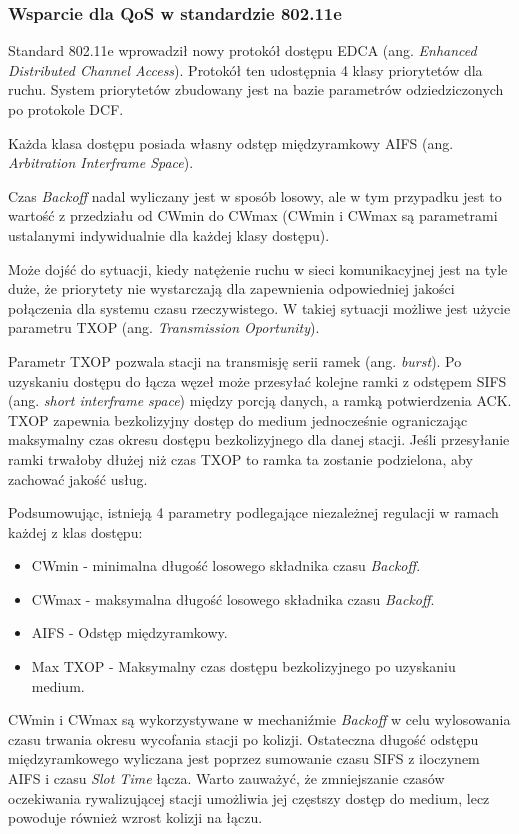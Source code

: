 \subsubsection{Wsparcie dla QoS w standardzie 802.11e}

Standard 802.11e wprowadził nowy protokół dostępu EDCA (ang. \emph{Enhanced Distributed Channel Access}). Protokół ten udostępnia 4 klasy priorytetów dla ruchu. System priorytetów zbudowany jest na bazie parametrów odziedziczonych po protokole DCF. 

Każda klasa dostępu posiada własny odstęp międzyramkowy AIFS (ang. \emph{Arbitration Interframe Space}).

Czas \emph{Backoff} nadal wyliczany jest w sposób losowy, ale w tym przypadku jest to wartość z przedziału od CWmin do CWmax (CWmin i CWmax są parametrami ustalanymi indywidualnie dla każdej klasy dostępu).

Może dojść do sytuacji, kiedy natężenie ruchu w sieci komunikacyjnej jest na tyle duże, że priorytety nie wystarczają dla zapewnienia odpowiedniej jakości połączenia dla systemu czasu rzeczywistego. W takiej sytuacji możliwe jest użycie parametru TXOP (ang. \emph{Transmission Oportunity}). 

Parametr TXOP pozwala stacji na transmisję serii ramek (ang. \emph{burst}). Po uzyskaniu dostępu do łącza
węzeł może przesyłać kolejne ramki z odstępem SIFS (ang. \emph{short interframe space}) między porcją danych, a
ramką potwierdzenia ACK. TXOP zapewnia bezkolizyjny dostęp do medium jednocześnie ograniczając maksymalny czas 
okresu dostępu bezkolizyjnego dla danej stacji. Jeśli przesyłanie ramki trwałoby dłużej niż czas TXOP to ramka
ta zostanie podzielona, aby zachować jakość usług.

Podsumowując, istnieją 4 parametry podlegające niezależnej regulacji w ramach każdej z klas dostępu:

\begin{itemize}
\item CWmin - minimalna długość losowego składnika czasu \emph{Backoff}.
\item CWmax - maksymalna długość losowego składnika czasu \emph{Backoff}.
\item AIFS - Odstęp międzyramkowy.
\item Max TXOP - Maksymalny czas dostępu bezkolizyjnego po uzyskaniu medium.
\end{itemize}

CWmin i CWmax są wykorzystywane w mechaniźmie \emph{Backoff} w celu wylosowania czasu trwania okresu wycofania stacji po
kolizji. Ostateczna długość odstępu międzyramkowego wyliczana jest poprzez sumowanie czasu SIFS z iloczynem AIFS i czasu
\emph{Slot Time} łącza. Warto zauważyć, że zmniejszanie czasów oczekiwania rywalizującej stacji umożliwia jej częstszy
dostęp do medium, lecz powoduje również wzrost kolizji na łączu. 

